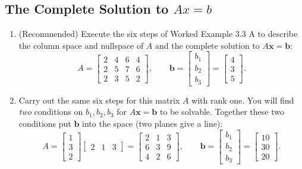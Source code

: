 \documentclass[14pt, a4paper]{article}
\begin{document}
\subsection{The Complete Solution to $Ax=b$}
\begin{enumerate}
    \item (Recommended) Execute the six steps of Worked Example 3.3 A to describe the column space and nullspace of $A$ and the complete solution to $A\mathbf{x} = \mathbf{b}$:
          \[
              A = \begin{bmatrix}
                  2 & 4 & 6 & 4 \\
                  2 & 5 & 7 & 6 \\
                  2 & 3 & 5 & 2
              \end{bmatrix}, \qquad
              \mathbf{b} = \begin{bmatrix} b_1 \\ b_2 \\ b_3 \end{bmatrix}
              = \begin{bmatrix} 4 \\ 3 \\ 5 \end{bmatrix}.
          \]

    \item Carry out the same six steps for this matrix $A$ with rank one. You will find \emph{two} conditions on $b_1, b_2, b_3$ for $A\mathbf{x} = \mathbf{b}$ to be solvable. Together these two conditions put $\mathbf{b}$ into the \underline{\hspace{2cm}} space (two planes give a line):
          \[
              A = \begin{bmatrix} 1 \\ 3 \\ 2 \end{bmatrix}
              \begin{bmatrix} 2 & 1 & 3 \end{bmatrix}
              =
              \begin{bmatrix}
                  2 & 1 & 3 \\
                  6 & 3 & 9 \\
                  4 & 2 & 6
              \end{bmatrix},
              \qquad
              \mathbf{b} = \begin{bmatrix} b_1 \\ b_2 \\ b_3 \end{bmatrix}
              = \begin{bmatrix} 10 \\ 30 \\ 20 \end{bmatrix}.
          \]
\end{enumerate}
\end{document}
